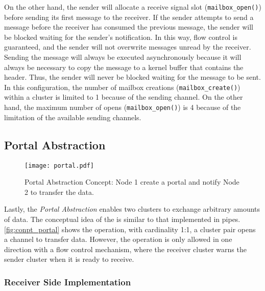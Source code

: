 				On the other hand, the sender will allocate a receive signal slot (\texttt{mailbox\_open()})
				before sending its first message to the receiver.
				If the sender attempts to send a message before the receiver has consumed
				the previous message, the sender will be blocked waiting for the sender's notification.
				In this way, flow control is guaranteed, and the sender will not overwrite
				messages unread by the receiver.
				Sending the message will always be executed asynchronously
				because it will always be necessary to copy the message to
				a kernel buffer that contains the header.
				Thus, the sender will never be blocked waiting for the message to be sent.
				In this configuration, the number of mailbox creations (\texttt{mailbox\_create()})
				within a cluster is limited to 1 because of the \cnoc sending channel.
				On the other hand, the maximum number of opens (\texttt{mailbox\_open()}) is
				4 because of the limitation of the available \dnoc sending channels.

		\subsection{Portal Abstraction}
		\label{sec.portal-abs}

			\begin{figure}[!tb]
				\centering%
				\caption{Portal Abstraction Concept: Node 1 create a portal and notify Node 2 to transfer the data.}%
				\label{fig:conpt_portal}%
				\texttt{[image: portal.pdf]}%
			\end{figure}


			Lastly, the \textit{Portal Abstraction} enables two clusters to exchange arbitrary
			amounts of data.
			The conceptual idea of the \portal is similar to that implemented in \posix pipes.
			\autoref{fig:conpt_portal} shows the \portal operation, with cardinality
			1:1, a cluster pair opens a channel to transfer data.
			However, the operation is only allowed in one direction with a flow control mechanism,
			where the receiver cluster warns the sender cluster when it is ready to receive.

			\subsubsection{Receiver Side Implementation}

